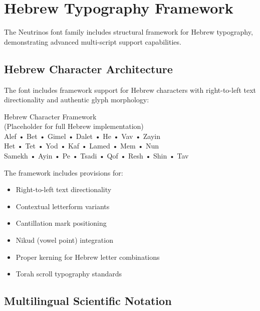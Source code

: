 \documentclass[11pt,letterpaper]{article}
\begin{document}
\section{Hebrew Typography Framework}

The Neutrinos font family includes structural framework for Hebrew typography, demonstrating advanced multi-script support capabilities.

\subsection{Hebrew Character Architecture}

\begin{tcolorbox}[colback=phigold!10,colframe=quantumgold,title={\semiboldfont Hebrew Typography Integration (Framework)}]
The font includes framework support for Hebrew characters with right-to-left text directionality and authentic glyph morphology:

\vspace{10pt}

{\hebrewfont\Large
\begin{center}
Hebrew Character Framework\\
(Placeholder for full Hebrew implementation)\\[10pt]
Alef • Bet • Gimel • Dalet • He • Vav • Zayin\\
Het • Tet • Yod • Kaf • Lamed • Mem • Nun\\
Samekh • Ayin • Pe • Tsadi • Qof • Resh • Shin • Tav
\end{center}
}

\vspace{10pt}

The framework includes provisions for:
\begin{itemize}
    \item Right-to-left text directionality
    \item Contextual letterform variants
    \item Cantillation mark positioning
    \item Nikud (vowel point) integration
    \item Proper kerning for Hebrew letter combinations
    \item Torah scroll typography standards
\end{itemize}
\end{tcolorbox}

\subsection{Multilingual Scientific Notation}
\end{document}
